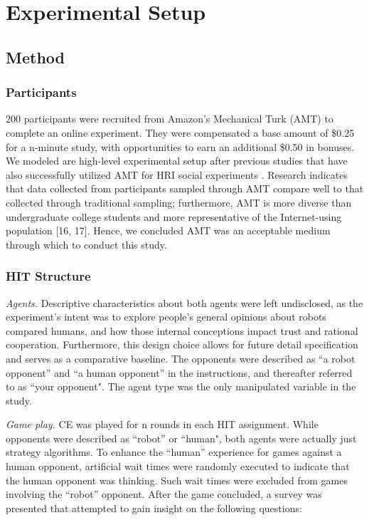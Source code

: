\documentclass{sig-alternate}
\begin{document}
\section{Experimental Setup}
\subsection{Method}
\subsubsection{Participants}
200 participants were recruited from Amazon's Mechanical Turk (AMT) to complete an online experiment. They were compensated a base amount of \$0.25 for a n-minute study, with opportunities to earn an additional \$0.50 in bonuses. We modeled are high-level experimental setup after previous studies that have also successfully utilized AMT for HRI social experiments \cite{malle2015sacrifice}.  Research indicates that data collected from participants sampled through AMT compare well to that collected through traditional sampling; furthermore, AMT is more diverse than undergraduate college students and more representative of the Internet-using population  [16, 17].   Hence, we concluded AMT was an acceptable medium through which to conduct this study.

\subsubsection{HIT Structure}
\textit{Agents. } Descriptive characteristics about both agents were left undisclosed, as the experiment's intent was to explore people's general opinions about robots compared humans, and how those internal conceptions impact trust and rational cooperation. Furthermore, this design choice allows for future detail specification and serves as a comparative baseline. The opponents were described as ``a robot opponent'' and ``a human opponent'' in the instructions, and thereafter referred to as ``your opponent". The agent type was the only manipulated variable in the study.

\textit{Game play. } CE was played for n rounds in each HIT assignment. While opponents were described as ``robot'' or ``human", both agents were actually just strategy algorithms. To enhance the ``human'' experience for games against a human opponent, artificial wait times were randomly executed to indicate that the human opponent was thinking. Such wait times were excluded from games involving the ``robot'' opponent. After the game concluded, a survey was presented that attempted to gain insight on the following questions:
\end{document}

